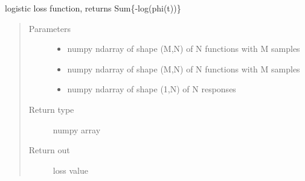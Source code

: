 \documentclass[letterpaper,10pt,english]{sphinxmanual}
\begin{document}
\begin{fulllineitems}
\label{\detokenize{regression:regression.logit_loss}}
logistic loss function, returns Sum\{-log(phi(t))\}
\begin{quote}\begin{description}
\item[{Parameters}] \leavevmode\begin{itemize}
\item {} 
 \textendash{} numpy ndarray of shape (M,N) of N functions with M samples

\item {} 
 \textendash{} numpy ndarray of shape (M,N) of N functions with M samples

\item {} 
 \textendash{} numpy ndarray of shape (1,N) of N responses

\end{itemize}

\item[{Return type}] \leavevmode
numpy array

\item[{Return out}] \leavevmode
loss value

\end{description}\end{quote}

\end{fulllineitems}

\end{document}
